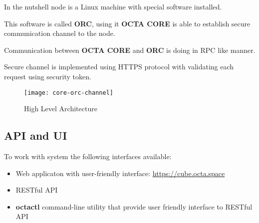In the nutshell node is a Linux machine with special software installed.

This software is called \textbf{ORC}, using it \textbf{OCTA CORE} is able to establish secure communication channel to the node.

Communication between \textbf{OCTA CORE} and \textbf{ORC} is doing in RPC\cite{rpc} like manner.

Secure channel is implemented using HTTPS\cite{https} protocol with validating each request using security token.

\begin{figure}[H]
    \texttt{[image: core-orc-channel]}
    \caption{High Level Architecture}
\end{figure}

\subsection{API and UI}

To work with system the following interfaces available:

\begin{itemize}
    \item Web applicaton with user-friendly interface: \url{https://cube.octa.space}
    \item RESTful API
    \item \textbf{octactl} command-line utility that provide user friendly interface to RESTful API
\end{itemize}
